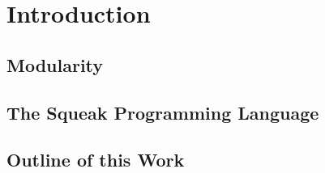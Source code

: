 \chapter{Introduction}

\section{Modularity}

\section{The Squeak Programming Language}

\section{Outline of this Work}
